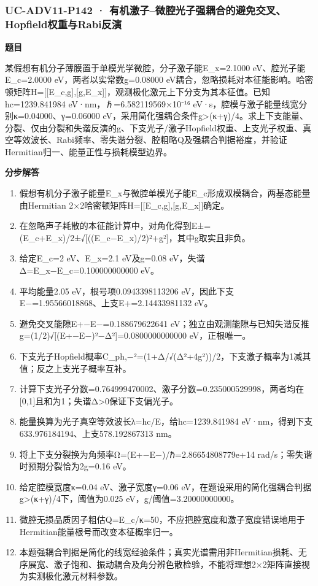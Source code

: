 \documentclass[UTF8,11pt,a4paper]{ctexart}
\begin{document}
\subsubsection*{UC-ADV11-P142 · 有机激子–微腔光子强耦合的避免交叉、Hopfield权重与Rabi反演}
\noindent\textbf{题目}\par
某假想有机分子薄膜置于单模光学微腔，分子激子能E\_x=2.1000 eV、腔光子能E\_c=2.0000 eV，两者以实常数g=0.08000 eV耦合，忽略损耗对本征能影响。哈密顿矩阵H=[[E\_c,g],[g,E\_x]]，观测极化激元上下分支为其本征值。已知hc=1239.841984 eV·nm，ℏ=6.582119569×10⁻¹⁶ eV·s，腔模与激子能量线宽分别κ=0.04000、γ=0.06000 eV，采用简化强耦合条件g>(κ+γ)/4。求上下支能量、分裂、仅由分裂和失谐反演的g、下支光子/激子Hopfield权重、上支光子权重、真空等效波长、Rabi频率、零失谐分裂、腔粗略Q及强耦合判据裕度，并验证Hermitian归一、能量正性与损耗模型边界。\par
\medskip\noindent\textbf{分步解答}
\begin{enumerate}
\item 假想有机分子激子能量E\_x与微腔单模光子能E\_c形成双模耦合，两基态能量由Hermitian 2×2哈密顿矩阵H=[[E\_c,g],[g,E\_x]]确定。
\item 在忽略声子耗散的本征能计算中，对角化得到E±=(E\_c+E\_x)/2±√[((E\_c−E\_x)/2)²+g²]，其中g取实且非负。
\item 给定E\_c=2 eV、E\_x=2.1 eV及g=0.08 eV，失谐Δ=E\_x−E\_c=0.100000000000 eV。
\item 平均能量2.05 eV，根号项0.0943398113206 eV，因此下支E−=1.95566018868、上支E+=2.14433981132 eV。
\item 避免交叉能隙E+−E−=0.188679622641 eV；独立由观测能隙与已知失谐反推g=(1/2)√[(E+−E−)²−Δ²]=0.0800000000000 eV，正根唯一。
\item 下支光子Hopfield概率C\_ph,−²=(1+Δ/√(Δ²+4g²))/2，下支激子概率为1减其值；反之上支光子概率互补。
\item 计算下支光子分数=0.764999470002、激子分数=0.235000529998，两者均在[0,1]且和为1；失谐Δ>0保证下支偏光子。
\item 能量换算为光子真空等效波长λ=hc/E，给hc=1239.841984 eV·nm，得到下支633.976184194、上支578.192867313 nm。
\item 将上下支分裂换为角频率Ω=(E+−E−)/ℏ=2.86654808779e+14 rad/s；零失谐时预期分裂恰为2g=0.16 eV。
\item 给定腔模宽度κ=0.04 eV、激子宽度γ=0.06 eV，在题设采用的简化强耦合判据g>(κ+γ)/4下，阈值为0.025 eV，g/阈值=3.20000000000。
\item 微腔无损品质因子粗估Q=E\_c/κ=50，不应把腔宽度和激子宽度错误地用于Hermitian能量根号而改变本征概率归一。
\item 本题强耦合判据是简化的线宽经验条件；真实光谱需用非Hermitian损耗、无序展宽、激子饱和、振动耦合及角分辨色散检验，不能将理想2×2矩阵直接视为实测极化激元材料参数。
\end{enumerate}
\end{document}
